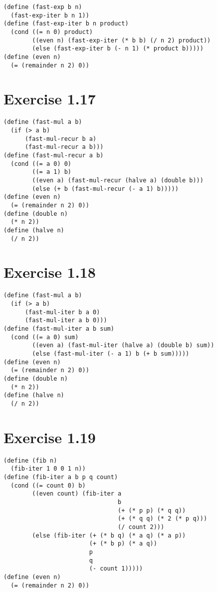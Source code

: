 \documentclass[../main.tex]{subfiles}
\begin{document}
\begin{lstlisting}
(define (fast-exp b n)
  (fast-exp-iter b n 1))
(define (fast-exp-iter b n product)
  (cond ((= n 0) product)
        ((even n) (fast-exp-iter (* b b) (/ n 2) product))
        (else (fast-exp-iter b (- n 1) (* product b)))))
(define (even n)
  (= (remainder n 2) 0))
\end{lstlisting}

\section{Exercise 1.17}

\begin{lstlisting}
(define (fast-mul a b)
  (if (> a b)
      (fast-mul-recur b a)
      (fast-mul-recur a b)))
(define (fast-mul-recur a b)
  (cond ((= a 0) 0)
        ((= a 1) b)
        ((even a) (fast-mul-recur (halve a) (double b)))
        (else (+ b (fast-mul-recur (- a 1) b)))))
(define (even n)
  (= (remainder n 2) 0))
(define (double n)
  (* n 2))
(define (halve n)
  (/ n 2))
\end{lstlisting}

\section{Exercise 1.18}

\begin{lstlisting}
(define (fast-mul a b)
  (if (> a b)
      (fast-mul-iter b a 0)
      (fast-mul-iter a b 0)))
(define (fast-mul-iter a b sum)
  (cond ((= a 0) sum)
        ((even a) (fast-mul-iter (halve a) (double b) sum))
        (else (fast-mul-iter (- a 1) b (+ b sum)))))
(define (even n)
  (= (remainder n 2) 0))
(define (double n)
  (* n 2))
(define (halve n)
  (/ n 2))
\end{lstlisting}

\section{Exercise 1.19}

\begin{lstlisting}
(define (fib n)
  (fib-iter 1 0 0 1 n))
(define (fib-iter a b p q count)
  (cond ((= count 0) b)
        ((even count) (fib-iter a
                                b
                                (+ (* p p) (* q q))
                                (+ (* q q) (* 2 (* p q)))
                                (/ count 2)))
        (else (fib-iter (+ (* b q) (* a q) (* a p))
                        (+ (* b p) (* a q))
                        p
                        q
                        (- count 1)))))
(define (even n)
  (= (remainder n 2) 0))
\end{lstlisting}
\end{document}
